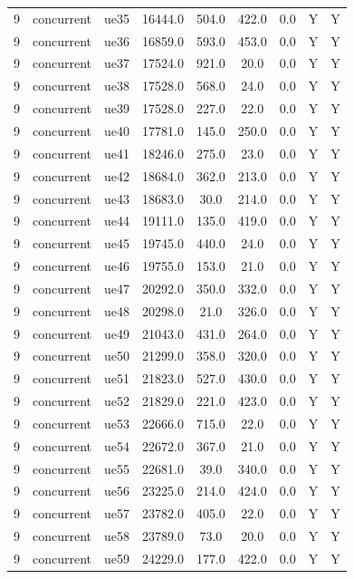 \begin{table}[ht]
\begin{tabular}{|c|c|c|c|c|c|c|c|c|}
9 & concurrent & ue35 & 16444.0 & 504.0 & 422.0 & 0.0 & Y & Y \\
9 & concurrent & ue36 & 16859.0 & 593.0 & 453.0 & 0.0 & Y & Y \\
9 & concurrent & ue37 & 17524.0 & 921.0 & 20.0 & 0.0 & Y & Y \\
9 & concurrent & ue38 & 17528.0 & 568.0 & 24.0 & 0.0 & Y & Y \\
9 & concurrent & ue39 & 17528.0 & 227.0 & 22.0 & 0.0 & Y & Y \\
9 & concurrent & ue40 & 17781.0 & 145.0 & 250.0 & 0.0 & Y & Y \\
9 & concurrent & ue41 & 18246.0 & 275.0 & 23.0 & 0.0 & Y & Y \\
9 & concurrent & ue42 & 18684.0 & 362.0 & 213.0 & 0.0 & Y & Y \\
9 & concurrent & ue43 & 18683.0 & 30.0 & 214.0 & 0.0 & Y & Y \\
9 & concurrent & ue44 & 19111.0 & 135.0 & 419.0 & 0.0 & Y & Y \\
9 & concurrent & ue45 & 19745.0 & 440.0 & 24.0 & 0.0 & Y & Y \\
9 & concurrent & ue46 & 19755.0 & 153.0 & 21.0 & 0.0 & Y & Y \\
9 & concurrent & ue47 & 20292.0 & 350.0 & 332.0 & 0.0 & Y & Y \\
9 & concurrent & ue48 & 20298.0 & 21.0 & 326.0 & 0.0 & Y & Y \\
9 & concurrent & ue49 & 21043.0 & 431.0 & 264.0 & 0.0 & Y & Y \\
9 & concurrent & ue50 & 21299.0 & 358.0 & 320.0 & 0.0 & Y & Y \\
9 & concurrent & ue51 & 21823.0 & 527.0 & 430.0 & 0.0 & Y & Y \\
9 & concurrent & ue52 & 21829.0 & 221.0 & 423.0 & 0.0 & Y & Y \\
9 & concurrent & ue53 & 22666.0 & 715.0 & 22.0 & 0.0 & Y & Y \\
9 & concurrent & ue54 & 22672.0 & 367.0 & 21.0 & 0.0 & Y & Y \\
9 & concurrent & ue55 & 22681.0 & 39.0 & 340.0 & 0.0 & Y & Y \\
9 & concurrent & ue56 & 23225.0 & 214.0 & 424.0 & 0.0 & Y & Y \\
9 & concurrent & ue57 & 23782.0 & 405.0 & 22.0 & 0.0 & Y & Y \\
9 & concurrent & ue58 & 23789.0 & 73.0 & 20.0 & 0.0 & Y & Y \\
9 & concurrent & ue59 & 24229.0 & 177.0 & 422.0 & 0.0 & Y & Y \\

\end{tabular}
\end{table}
